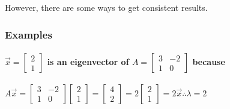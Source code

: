\documentclass[
  letterpaper,
  DIV=11,
  numbers=noendperiod]{scrartcl}
\let\oldparagraph\paragraph
\renewcommand{\paragraph}[1]{\oldparagraph{#1}\mbox{}}
\begin{document}
However, there are some ways to get consistent results.

\subsubsection{Examples}\label{examples-2}

\paragraph{\texorpdfstring{\(\vec{x} = \begin{bmatrix}2 \\ 1 \end{bmatrix}\)
is an eigenvector of \(A = \begin{bmatrix}3 & -2 \\ 1 & 0\end{bmatrix}\)
because}{\textbackslash vec\{x\} = \textbackslash begin\{bmatrix\}2 \textbackslash\textbackslash{} 1 \textbackslash end\{bmatrix\} is an eigenvector of A = \textbackslash begin\{bmatrix\}3 \& -2 \textbackslash\textbackslash{} 1 \& 0\textbackslash end\{bmatrix\} because}}\label{vecx-beginbmatrix2-1-endbmatrix-is-an-eigenvector-of-a-beginbmatrix3--2-1-0endbmatrix-because}

\(A\vec{x} = \begin{bmatrix}3 & -2 \\ 1 & 0\end{bmatrix}\begin{bmatrix}2 \\ 1\end{bmatrix} = \begin{bmatrix}4 \\ 2\end{bmatrix} = 2\begin{bmatrix}2 \\ 1\end{bmatrix} = 2\vec{x} \therefore \lambda = 2\)
\end{document}
